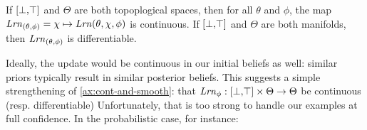 \begin{LrnAxioms}
	\item
	If $[\bot,\!\top]$ and $\Theta$ are both topoplogical spaces, then 
	for all $\theta$ and $\phi$, 
	the map
	$
	\mathit{Lrn}_{(\theta,\phi)} = 
	\chi \mapsto 
	\mathit{Lrn}(\theta,\chi,\phi)
	$
	is continuous.
	If $[\bot,\!\top]$ and $\Theta$ are both manifolds, then 
	$\mathit{Lrn}_{(\theta,\phi)}$ is 
	differentiable.
		\label{ax:cont-and-smooth}
\end{LrnAxioms}
Ideally, the update would be continuous in our initial
beliefs as well: similar priors typically result
in similar posterior beliefs.
This suggests a simple strengthening of \cref{ax:cont-and-smooth}:
that
$\mathit{Lrn}_\phi :[\bot,\!\top] \times \Theta \to \Theta$ 
be continuous (resp. differentiable)
Unfortunately,
that is too strong to handle our examples at full confidence.
In the probabilistic case, for instance:

